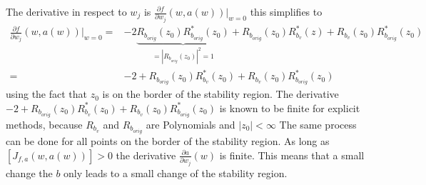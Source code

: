 \documentclass{article}
\begin{document}
The derivative in respect to $w_j$ is 
$ \frac{\partial f}{\partial w_j}(w,a(w)) \Big|_{w=0}$
this simplifies to 
\begin{align*}\label{eq:derivative_to_b}
 \frac{\partial f}{\partial w_j}(w,a(w)) \Big|_{w=0} =&
- 2 \underbrace{R_{b_{orig}}(z_0)R^*_{b_{orig}}(z_0)}_{=|R_{b_{orig}}(z_0)|^2=1} + R_{b_{orig}}(z_0)R^*_{b_v}(z) + R_{b_v}(z_0)R^*_{b_{orig}}(z_0) \\
=& -2 + R_{b_{orig}}(z_0)R^*_{b_v}(z_0) + R_{b_v}(z_0)R^*_{b_{orig}}(z_0)
\end{align*}
using the fact that $z_0$ is on the border of the stability region.
The derivative $-2 + R_{b_{orig}}(z_0)R^*_{b_v}(z_0) + R_{b_v}(z_0)R^*_{b_{orig}}(z_0)$ is known to be finite for explicit methods, because $R_{b_v}$ and $R_{b_{orig}}$ are Polynomials and $|z_0| < \infty$
The same process can be done for all points on the border of the stability region. 
As long as $\left[ J_{f,a}(w,a(w))  \right] > 0$ the derivative $\frac{\partial a}{\partial w_j} (w)$ is finite. This means that a small change the $b$ only leads to a small change of the stability region.




\printbibliography
\end{document}
